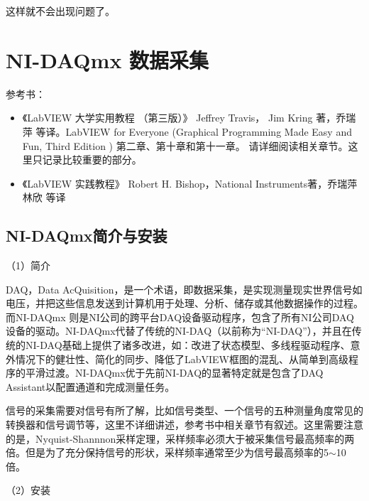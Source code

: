 这样就不会出现问题了。


\section{NI-DAQmx 数据采集}
参考书：
\begin{itemize}
\item 《LabVIEW 大学实用教程 （第三版）》 Jeffrey Travis， Jim Kring 著，乔瑞萍 等译。LabVIEW for Everyone (Graphical Programming Made Easy and Fun, Third Edition ) 第二章、第十章和第十一章。
请详细阅读相关章节。这里只记录比较重要的部分。

\item 《LabVIEW 实践教程》 Robert H. Bishop，National Instruments著，乔瑞萍 林欣 等译
\end{itemize}



\subsection{NI-DAQmx简介与安装}
（1）简介

 DAQ，Data AcQuisition，是一个术语，即数据采集，是实现测量现实世界信号如电压，并把这些信息发送到计算机用于处理、分析、储存或其他数据操作的过程。而NI-DAQmx 则是NI公司的跨平台DAQ设备驱动程序，包含了所有NI公司DAQ设备的驱动。NI-DAQmx代替了传统的NI-DAQ（以前称为“NI-DAQ”），并且在传统的NI-DAQ基础上提供了诸多改进，如：改进了状态模型、多线程驱动程序、意外情况下的健壮性、简化的同步、降低了LabVIEW框图的混乱、从简单到高级程序的平滑过渡。NI-DAQmx优于先前NI-DAQ的显著特定就是包含了DAQ Assistant以配置通道和完成测量任务。

信号的采集需要对信号有所了解，比如信号类型、一个信号的五种测量角度常见的转换器和信号调节等，这里不详细讲述，参考书中相关章节有叙述。这里需要注意的是，Nyquist-Shannnon采样定理，采样频率必须大于被采集信号最高频率的两倍。但是为了充分保持信号的形状，采样频率通常至少为信号最高频率的5$\sim$10倍。


（2）安装

